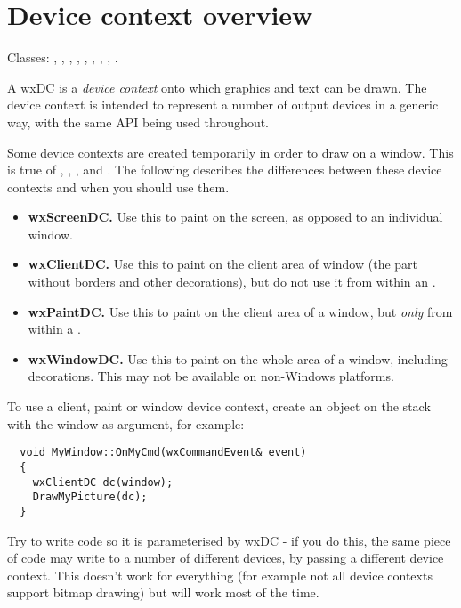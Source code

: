 \section{Device context overview}\label{dcoverview}

Classes: , ,\rtfsp
\rtfsp{}, , ,\rtfsp
{}, , ,\rtfsp
{}.

A wxDC is a {\it device context} onto which graphics and text can be drawn.
The device context is intended to represent a number of output devices in a generic way,
with the same API being used throughout.

Some device contexts are created temporarily in order to draw on a window.
This is true of , , ,
and . The following describes the differences between
these device contexts and when you should use them.

\begin{itemize}\itemsep=0pt
\item {\bf wxScreenDC.} Use this to paint on the screen, as opposed to an individual window.
\item {\bf wxClientDC.} Use this to paint on the client area of window (the part without
borders and other decorations), but do not use it from within an .
\item {\bf wxPaintDC.} Use this to paint on the client area of a window, but {\it only} from
within a .
\item {\bf wxWindowDC.} Use this to paint on the whole area of a window, including decorations.
This may not be available on non-Windows platforms.
\end{itemize}

To use a client, paint or window device context, create an object on the stack with
the window as argument, for example:

\begin{verbatim}
  void MyWindow::OnMyCmd(wxCommandEvent& event)
  {
    wxClientDC dc(window);
    DrawMyPicture(dc);
  }
\end{verbatim}

Try to write code so it is parameterised by wxDC - if you do this, the same piece of code may
write to a number of different devices, by passing a different device context. This doesn't
work for everything (for example not all device contexts support bitmap drawing) but
will work most of the time.

